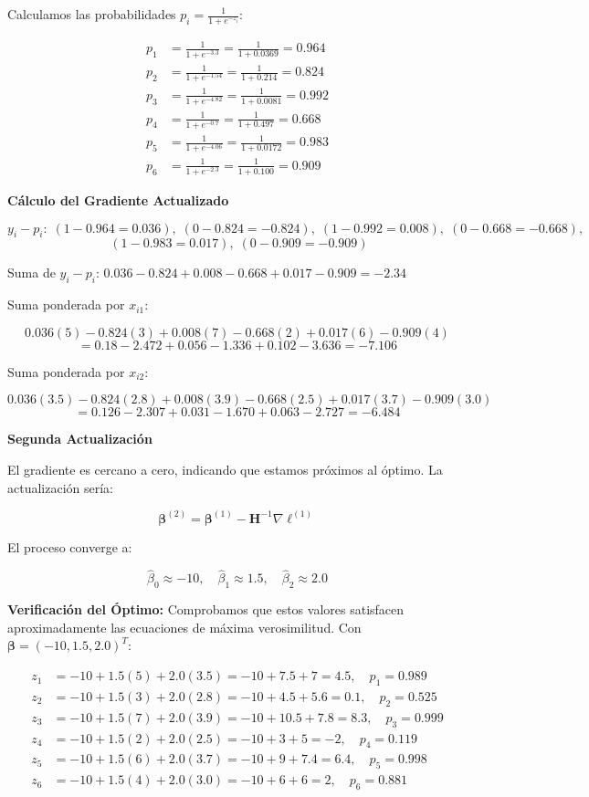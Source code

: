 \documentclass[12pt]{article}
\begin{document}
Calculamos las probabilidades $p_i = \frac{1}{1+e^{-z_i}}$:

\[
\begin{aligned}
p_1 &= \frac{1}{1+e^{-3.3}} = \frac{1}{1+0.0369} = 0.964 \\
p_2 &= \frac{1}{1+e^{-1.54}} = \frac{1}{1+0.214} = 0.824 \\
p_3 &= \frac{1}{1+e^{-4.82}} = \frac{1}{1+0.0081} = 0.992 \\
p_4 &= \frac{1}{1+e^{-0.7}} = \frac{1}{1+0.497} = 0.668 \\
p_5 &= \frac{1}{1+e^{-4.06}} = \frac{1}{1+0.0172} = 0.983 \\
p_6 &= \frac{1}{1+e^{-2.3}} = \frac{1}{1+0.100} = 0.909
\end{aligned}
\]

\textbf{Cálculo del Gradiente Actualizado}

\[
y_i - p_i: \; (1-0.964=0.036), \; (0-0.824=-0.824), \; (1-0.992=0.008), \; (0-0.668=-0.668), 
\]
%
\[
 \; (1-0.983=0.017), \; (0-0.909=-0.909)
\]

Suma de $y_i-p_i$: $0.036 - 0.824 + 0.008 - 0.668 + 0.017 - 0.909 = -2.34$

Suma ponderada por $x_{i1}$:

\[
0.036(5) - 0.824(3) + 0.008(7) - 0.668(2) + 0.017(6) - 0.909(4)
\]
\[
= 0.18 - 2.472 + 0.056 - 1.336 + 0.102 - 3.636 = -7.106
\]

Suma ponderada por $x_{i2}$:

\[
0.036(3.5) - 0.824(2.8) + 0.008(3.9) - 0.668(2.5) + 0.017(3.7) - 0.909(3.0)
\]
\[
= 0.126 - 2.307 + 0.031 - 1.670 + 0.063 - 2.727 = -6.484
\]

\textbf{Segunda Actualización}

El gradiente es cercano a cero, indicando que estamos próximos al óptimo. La actualización sería:

\[
\boldsymbol{\beta}^{(2)} = \boldsymbol{\beta}^{(1)} - \mathbf{H}^{-1} \nabla \ell^{(1)}
\]

El proceso converge a:

\[
\hat{\beta}_0 \approx -10, \quad \hat{\beta}_1 \approx 1.5, \quad \hat{\beta}_2 \approx 2.0
\]

\textbf{Verificación del Óptimo:} Comprobamos que estos valores satisfacen aproximadamente las ecuaciones de máxima verosimilitud. Con $\boldsymbol{\beta} = (-10, 1.5, 2.0)^T$:

\[
\begin{aligned}
z_1 &= -10 + 1.5(5) + 2.0(3.5) = -10 + 7.5 + 7 = 4.5, \quad p_1 = 0.989 \\
z_2 &= -10 + 1.5(3) + 2.0(2.8) = -10 + 4.5 + 5.6 = 0.1, \quad p_2 = 0.525 \\
z_3 &= -10 + 1.5(7) + 2.0(3.9) = -10 + 10.5 + 7.8 = 8.3, \quad p_3 = 0.999 \\
z_4 &= -10 + 1.5(2) + 2.0(2.5) = -10 + 3 + 5 = -2, \quad p_4 = 0.119 \\
z_5 &= -10 + 1.5(6) + 2.0(3.7) = -10 + 9 + 7.4 = 6.4, \quad p_5 = 0.998 \\
z_6 &= -10 + 1.5(4) + 2.0(3.0) = -10 + 6 + 6 = 2, \quad p_6 = 0.881
\end{aligned}
\]
\end{document}
